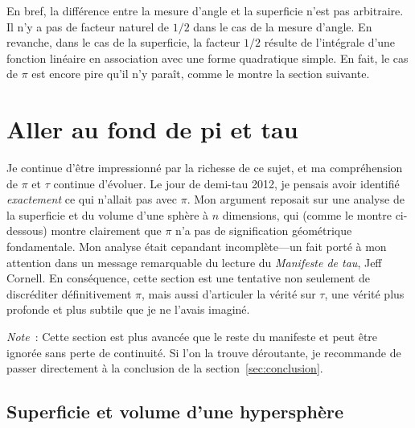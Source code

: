 En bref, la différence entre la mesure d'angle et la superficie n'est pas
arbitraire. \linebreak Il n'y a pas de facteur naturel de $1/2$ dans le cas de
la mesure d'angle. En revanche, dans le cas de la superficie, la facteur $1/2$
résulte de l'intégrale d'une fonction linéaire en association avec une forme
quadratique simple. En fait, le cas de $\pi$ est encore pire qu'il n'y paraît,
comme le montre la section suivante.


\section{Aller au fond de pi et tau} %
\label{sec:getting_to_the_bottom_of_pi}

Je continue d'être impressionné par la richesse de ce sujet, et ma compréhension de $\pi$ et $\tau$ continue d'évoluer. Le jour de demi-tau 2012, je pensais avoir identifié \emph{exactement} ce qui n'allait pas avec $\pi$. Mon argument reposait sur une analyse de la superficie et du volume d'une sphère à $n$ dimensions, qui (comme le montre ci-dessous) montre clairement que $\pi$ n'a pas de signification géométrique fondamentale. Mon analyse était cepandant incomplète---un fait porté à mon attention dans un message remarquable du lecture du \emph{Manifeste de tau}, Jeff Cornell. En conséquence, cette section est une tentative non seulement de discréditer définitivement $\pi$, mais aussi d'articuler la vérité sur $\tau$, une vérité plus profonde et plus subtile que je ne l'avais imaginé.

\emph{Note}~: Cette section est plus avancée que le reste du manifeste et peut être ignorée sans perte de continuité. Si l'on la trouve déroutante, je recommande de passer directement à la conclusion de la section~\ref{sec:conclusion}.

  \subsection{Superficie et volume d'une hypersphère} %
  \label{sec:volume_of_a_hypersphere}

